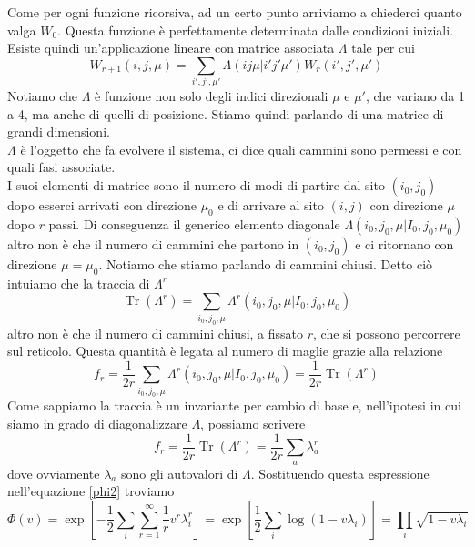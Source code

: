 \documentclass[11pt]{article}
\DeclareMathOperator{\Tr}{Tr}
\DeclareMathOperator{\Exp}{exp}
\DeclareMathOperator{\Log}{log}
\begin{document}
Come per ogni funzione ricorsiva, ad un certo punto arriviamo a chiederci quanto valga $W_0$. Questa funzione è perfettamente determinata dalle condizioni iniziali. \\
Esiste quindi un'applicazione lineare con matrice associata $\Lambda$ tale per cui
\begin{equation}\label{deflambda}
W_{r+1}(i,j,\mu)=\sum_{i',j',\mu'}\Lambda(ij\mu|i'j'\mu')W_{r}(i',j',\mu')
\end{equation}
Notiamo che $\Lambda$ è funzione non solo degli indici direzionali $\mu$ e $\mu'$, che variano da 1 a 4, ma anche di quelli di posizione. Stiamo quindi parlando di una matrice di grandi dimensioni.\\
$\Lambda$ è l'oggetto che fa evolvere il sistema, ci dice quali cammini sono permessi e con quali fasi associate.\\
I suoi elementi di matrice sono il numero di modi di partire dal sito $(i_0,j_0)$ dopo esserci arrivati con direzione $\mu_0$ e di arrivare al sito $(i,j)$ con direzione $\mu$ dopo $r$ passi. Di conseguenza il generico elemento diagonale $\Lambda(i_0,j_0,\mu|I_0,j_0,\mu_0)$ altro non è che il numero di cammini che partono in $(i_0,j_0)$ e ci ritornano con direzione $\mu=\mu_0$. Notiamo che stiamo parlando di cammini chiusi.
Detto ciò intuiamo che la traccia di $\Lambda^r$
$$ \Tr{(\Lambda^r)}=\sum_{i_0,j_0,\mu} \Lambda^r(i_0,j_0,\mu|I_0,j_0,\mu_0)
$$ altro non è che il numero di cammini chiusi, a fissato $r$, che si possono percorrere sul reticolo. Questa quantità è legata al numero di maglie grazie alla relazione
\begin{equation}
f_r=\frac{1}{2r}\sum_{i_0,j_0,\mu} \Lambda^r(i_0,j_0,\mu|I_0,j_0,\mu_0)=\frac{1}{2r}\Tr{(\Lambda^r)}
\end{equation}
Come sappiamo la traccia è un invariante per cambio di base e, nell'ipotesi in cui siamo in grado di diagonalizzare $\Lambda$, possiamo scrivere
\begin{equation}\label{autovalori}
 f_r=\frac{1}{2r}\Tr{(\Lambda^r)}=\frac{1}{2r}\sum_a \lambda_a^r
\end{equation}
dove ovviamente $\lambda_a$ sono gli autovalori di $\Lambda$. Sostituendo questa espressione nell'equazione \ref{phi2} troviamo
\begin{equation}\label{prod}
\Phi(v)= \Exp \left [ -\frac{1}{2}\sum_i\sum_{r=1}^\infty\frac{1}{r}v^r\lambda_i^r \right ] = \Exp \left [ \frac{1}{2} \sum_i \Log (1-v\lambda_i) \right]= \prod_i \sqrt{1-v\lambda_i}
\end{equation}
\end{document}
